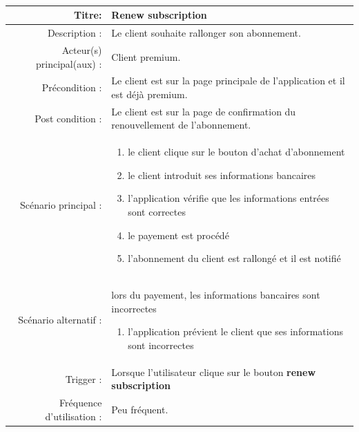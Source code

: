 \documentclass{report}
\begin{document}
\\\\\\
\begin{tabular}{|r|p{9cm}|}
    \hline
    Titre: & Renew subscription \\
    \hline
    Description : & Le client souhaite rallonger son abonnement. \\
    \hline
    Acteur(s) principal(aux) : & Client premium. \\
    \hline
    Précondition : & Le client est sur la page principale de l'application et il est déjà premium. \\
    \hline
    Post condition : & Le client est sur la page de confirmation du renouvellement de l'abonnement. \\
    \hline
    Scénario principal : & \begin{enumerate}[left=0pt, topsep=0pt]
        \item le client clique sur le bouton d'achat d'abonnement
        \item le client introduit ses informations bancaires
        \item l'application vérifie que les informations entrées sont correctes 
        \item le payement est procédé
        \item l'abonnement du client est rallongé et il est notifié
    \end{enumerate} \nointerlineskip\\
    \hline
    Scénario alternatif : & lors du payement, les informations bancaires sont incorrectes 
    \begin{enumerate}[left=0pt, topsep=0pt]
    		\item l'application prévient le client que ses informations sont incorrectes
    \end{enumerate} \nointerlineskip \\
    \hline
    Trigger : & Lorsque l'utilisateur clique sur le bouton \textbf{renew subscription} \\ 
    \hline
    Fréquence d'utilisation : & Peu fréquent. \\
    \hline
\end{tabular}
\\\\\\
\end{document}
